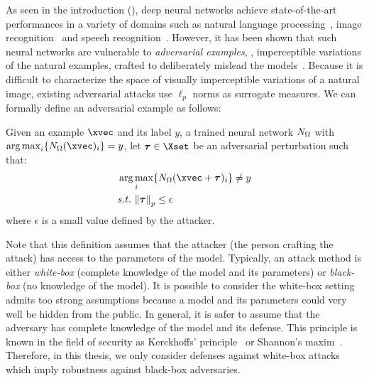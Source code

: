 As seen in the introduction (), deep neural networks achieve state-of-the-art performances in a variety of domains such as natural language processing~\cite{radford2018Language}, image recognition~\cite{he2016deep} and speech recognition~\cite{hinton2012deep}.
However, it has been shown that such neural networks are vulnerable to \emph{adversarial examples}, \ie, imperceptible variations of the natural examples, crafted to deliberately mislead the models~\cite{globerson2006nightmare,biggio2013evasion,szegedy2013intriguing}.
Because it is difficult to characterize the space of visually imperceptible variations of a natural image, existing adversarial attacks use $\ell_p$ norms as surrogate measures.
We can formally define an adversarial example as follows:
\begin{definition}
  Given an example $\xvec$ and its label $y$, a trained neural network $N_\Omega$ with $\argmax_i \{ \nn_\weights(\xvec)_i \} = y$, let $\adv \in \Xset$ be an adversarial perturbation such that:
  \begin{align}
    &\argmax_{i} \{ \nn_\weights (\xvec + \adv)_i \} \neq y \\
    &\st\ \norm{\adv}_p \leq \epsilon \notag
  \end{align}
  where $\epsilon$ is a small value defined by the attacker.
\end{definition}

Note that this definition assumes that the attacker (the person crafting the attack) has access to the parameters of the model.
Typically, an attack method is either \emph{white-box} (complete knowledge of the model and its parameters) or \emph{black-box} (no knowledge of the model).
It is possible to consider the white-box setting admits too strong assumptions because a model and its parameters could very well be hidden from the public.
In general, it is safer to assume that the adversary has complete knowledge of the model and its defense.
This principle is known in the field of security as Kerckhoffs’ principle~\cite{kerckhoffs1883cryptographie} or Shannon's maxim~\cite{shannon1949communication}.
Therefore, in this thesis, we only consider defenses against white-box attacks which imply robustness against black-box adversaries.


